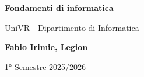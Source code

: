 \begin{titlepage}
	\begin{center}
		\vspace*{1cm}

		\Huge
		\textbf{Fondamenti di informatica}

		\vspace{0.5cm}
		\LARGE
		UniVR - Dipartimento di Informatica

		\vspace{1.5cm}

		\textbf{Fabio Irimie, Legion}

		\vfill


		\vspace{0.8cm}


		1° Semestre 2025/2026

	\end{center}
\end{titlepage}

